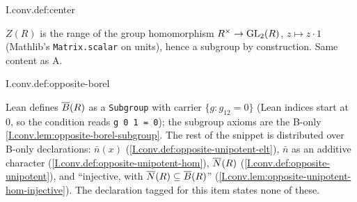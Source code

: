 \begin{definition}
\end{definition}
\begin{tfformal}{I.conv.def:center}
\begin{tffidelity}
$Z(R)$ is the range of the group homomorphism $R^\times\to\mathrm{GL}_2(R)$, $z\mapsto z\cdot1$ (Mathlib's \texttt{Matrix.scalar} on units), hence a subgroup by construction. Same content as A.
\end{tffidelity}
\end{tfformal}

\begin{definition}
\end{definition}
\begin{tfformal}{I.conv.def:opposite-borel}
\begin{tffidelity}
Lean defines $\overline{B}(R)$ as a \texttt{Subgroup} with carrier $\{g:g_{12}=0\}$ (Lean indices start at $0$, so the condition reads \texttt{g 0 1 = 0}); the subgroup axioms are the B-only \cref{I.conv.lem:opposite-borel-subgroup}. The rest of the snippet is distributed over B-only declarations: $\bar n(x)$ (\cref{I.conv.def:opposite-unipotent-elt}), $\bar n$ as an additive character (\cref{I.conv.def:opposite-unipotent-hom}), $\overline{N}(R)$ (\cref{I.conv.def:opposite-unipotent}), and ``injective, with $\overline{N}(R)\subseteq\overline{B}(R)$'' (\cref{I.conv.lem:opposite-unipotent-hom-injective}). The declaration tagged for this item states none of these.
\end{tffidelity}
\end{tfformal}

